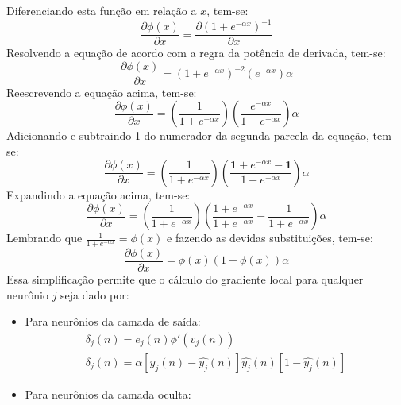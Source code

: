 \begin{enumerate}
    Diferenciando esta função em relação a $x$, tem-se:
    \begin{equation}
        \frac{\partial \phi(x)}{\partial x} = \frac{\partial (1+e^{-\alpha x})^{-1}}{\partial x}
    \end{equation}
    Resolvendo a equação de acordo com a regra da potência de derivada, tem-se:
    \begin{equation}
        \frac{\partial \phi(x)}{\partial x} = (1+e^{-\alpha x})^{-2} (e^{-\alpha x}) \alpha
    \end{equation}
    Reescrevendo a equação acima, tem-se:
    \begin{equation}
        \frac{\partial \phi(x)}{\partial x} = \left(\frac{1}{1+e^{-\alpha x}}\right) \left(\frac{e^{-\alpha x}}{1+e^{-\alpha x}} \right) \alpha
    \end{equation}
    Adicionando e subtraindo 1 do numerador da segunda parcela da equação, tem-se:
    \begin{equation}
        \frac{\partial \phi(x)}{\partial x} = \left(\frac{1}{1+e^{-\alpha x}}\right) \left(\frac{\textbf{1}+e^{-\alpha x} - \textbf{1}}{1+e^{-\alpha x}}\right) \alpha
    \end{equation}
    Expandindo a equação acima, tem-se:
    \begin{equation}
        \frac{\partial \phi(x)}{\partial x} = \left(\frac{1}{1+e^{-\alpha x}}\right) \left(\frac{1+e^{-\alpha x}}{1+e^{-\alpha x}} - \frac{1}{1+e^{-\alpha x}}\right) \alpha
    \end{equation}
    Lembrando que $\frac{1}{1+e^{-\alpha x}} = \phi(x)$ e fazendo as devidas substituições, tem-se:
    \begin{equation}
        \frac{\partial \phi(x)}{\partial x} = \phi(x) (1- \phi(x)) \alpha
    \end{equation}
    Essa simplificação permite que o cálculo do gradiente local para qualquer neurônio $j$ seja dado por:
        \begin{itemize}
        \item Para neurônios da camada de saída:
        \begin{equation}
            \begin{split}
            \delta_j(n) = e_j(n)\phi'(v_j(n)) \\
            \delta_j(n) = \alpha[y_j(n) - \hat{y_j}(n)]\hat{y_j}(n)[1 - \hat{y_j}(n)]    
            \end{split}
        \end{equation}
        \item Para neurônios da camada oculta:

\end{itemize}
\end{enumerate}
